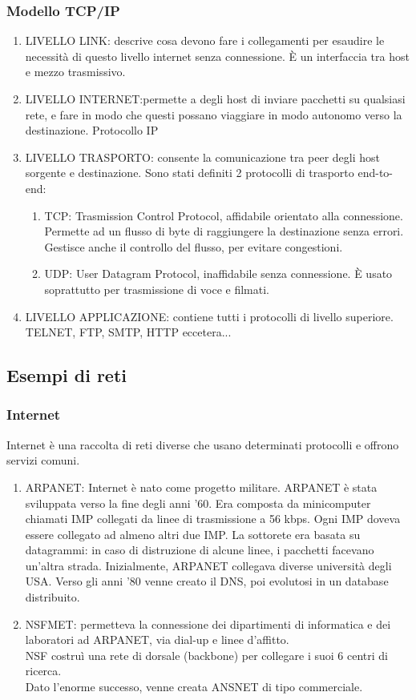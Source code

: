 \documentclass{article}
\begin{document}
			\subsubsection{Modello TCP/IP}
				\begin{enumerate}
					\item LIVELLO LINK: descrive cosa devono fare i collegamenti per esaudire le necessità di questo livello internet senza connessione. È un interfaccia tra host e mezzo trasmissivo.
					\item LIVELLO INTERNET:permette a degli host di inviare pacchetti su qualsiasi rete, e fare in modo che questi possano viaggiare in modo autonomo verso la destinazione. Protocollo IP
					\item LIVELLO TRASPORTO: consente la comunicazione tra peer degli host sorgente e destinazione. Sono stati definiti 2 protocolli di trasporto end-to-end:
					\begin{enumerate}
						\item TCP: Trasmission Control Protocol, affidabile orientato alla connessione. Permette ad un flusso di byte di raggiungere la destinazione senza errori. Gestisce anche il controllo del flusso, per evitare congestioni. 
						\item UDP: User Datagram Protocol, inaffidabile senza connessione. È usato soprattutto per trasmissione di voce e filmati. 
					\end{enumerate}
					\item LIVELLO APPLICAZIONE: contiene tutti i protocolli di livello superiore. TELNET, FTP, SMTP, HTTP eccetera...
				\end{enumerate}
		\subsection{Esempi di reti}
			\subsubsection{Internet}
			Internet è una raccolta di reti diverse che usano determinati protocolli e offrono servizi comuni. 
			\begin{enumerate}
				\item ARPANET: Internet è nato come progetto militare. ARPANET è stata sviluppata verso la fine degli anni '60. Era composta da minicomputer chiamati IMP collegati da linee di trasmissione a 56 kbps. Ogni IMP doveva essere collegato ad almeno altri due IMP. La sottorete era basata su datagrammi: in caso di distruzione di alcune linee, i pacchetti facevano un'altra strada. Inizialmente, ARPANET collegava diverse università degli USA. Verso gli anni '80 venne creato il DNS, poi evolutosi in un database distribuito. 
				\item NSFMET: permetteva la connessione dei dipartimenti di informatica e dei laboratori ad ARPANET, via dial-up e linee d'affitto. \\
				NSF costruì una rete di dorsale (backbone) per collegare i suoi 6 centri di ricerca.\\ Dato l'enorme successo, venne creata ANSNET di tipo commerciale. 
			\end{enumerate}
\end{document}
